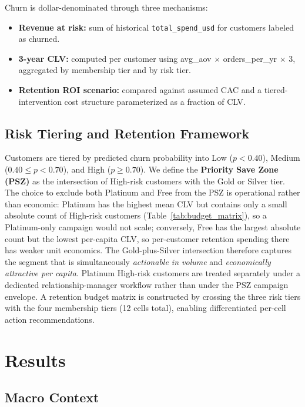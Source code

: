 \documentclass[conference]{IEEEtran}
\begin{document}
Churn is dollar-denominated through three mechanisms:

\begin{itemize}
\item \textbf{Revenue at risk:} sum of historical \texttt{total\_spend\_usd} for customers labeled as churned.
\item \textbf{3-year CLV:} computed per customer using avg\_aov $\times$ orders\_per\_yr $\times$ 3, aggregated by membership tier and by risk tier.
\item \textbf{Retention ROI scenario:} compared against assumed CAC and a tiered-intervention cost structure parameterized as a fraction of CLV.
\end{itemize}

\subsection{Risk Tiering and Retention Framework}

Customers are tiered by predicted churn probability into Low ($p < 0.40$), Medium ($0.40 \leq p < 0.70$), and High ($p \geq 0.70$). We define the \textbf{Priority Save Zone (PSZ)} as the intersection of High-risk customers with the Gold or Silver tier. The choice to exclude both Platinum and Free from the PSZ is operational rather than economic: Platinum has the highest mean CLV but contains only a small absolute count of High-risk customers (Table~\ref{tab:budget_matrix}), so a Platinum-only campaign would not scale; conversely, Free has the largest absolute count but the lowest per-capita CLV, so per-customer retention spending there has weaker unit economics. The Gold-plus-Silver intersection therefore captures the segment that is simultaneously \emph{actionable in volume} and \emph{economically attractive per capita}. Platinum High-risk customers are treated separately under a dedicated relationship-manager workflow rather than under the PSZ campaign envelope. A retention budget matrix is constructed by crossing the three risk tiers with the four membership tiers (12 cells total), enabling differentiated per-cell action recommendations.

\section{Results}

\subsection{Macro Context}
\end{document}
